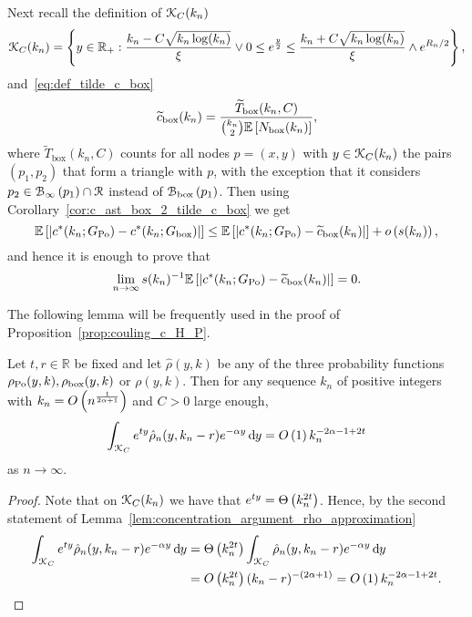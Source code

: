 Next recall the definition of ${\mathcal K}_{C}(k_n)$
\[
	{\mathcal K}_C(k_n) = \left\{y \in {\ensuremath{\mathbb R}}_+ : \frac{k_n - C \sqrt{k_n \log(k_n)}}{\xi} \vee 0 \le e^{\frac{y}{2}}
	\le \frac{k_n + C \sqrt{k_n \log(k_n)}}{\xi} \wedge e^{R_n/2} \right\},
\]
and~\eqref{eq:def_tilde_c_box}
\[
	\widetilde{c}_{\text{box}}(k_n) = \frac{\widetilde{T}_{\text{box}}(k_n,C)}{\binom{k_n}{2}\mathbb{E}\left[N_{\text{box}}(k_n)\right]},
\]
where $\widetilde{T}_{\text{box}}(k_n,C)$ counts for all nodes $p = (x,y)$ with $y \in {\mathcal K}_{C}(k_n)$ the pairs $(p_1,p_2)$ that form a triangle with $p$, with the exception that it considers $p_2 \in {\mathcal B}_{\infty}\left(p_1\right) \cap {\mathcal R}$ instead of ${\mathcal B}_{\text{box}}\left(p_1\right)$. Then using Corollary~\ref{cor:c_ast_box_2_tilde_c_box} we get
\[
	\mathbb{E}\left[\left|c^\ast(k_n; G_{\text{Po}}) - c^\ast(k_n;G_{\text{box}})\right|\right]
	\le \mathbb{E}\left[\left|c^\ast(k_n; G_{\text{Po}}) - \widetilde{c}_{\text{box}}(k_n)\right|\right] 
	+ o\left(s(k_n)\right),
\]
and hence it is enough to prove that
\[
	\lim_{n \to \infty} s(k_n)^{-1}\mathbb{E}\left[\left|c^\ast(k_n; G_{\text{Po}}) - \widetilde{c}_{\text{box}}(k_n)\right|\right] = 0.
\]



The following lemma will be frequently used in the proof of Proposition~\ref{prop:couling_c_H_P}.

\begin{lemma} \label{lem:gamma_approx}
Let $t, r \in \mathbb{R}$ be fixed and let $\hat{\rho}(y,k)$ be any of the three probability functions $\rho_{{\mathrm{Po}}}(y,k), \rho_{\text{box}}(y,k)$ or $\rho(y,k)$. Then for any sequence $k_n$ of positive integers with $k_n = O\left(n^{\frac{1}{2\alpha + 1}}\right)$ and $C > 0$ large enough,
\[
	\int_{{\mathcal K}_{C}} e^{t y} \hat{\rho}_n(y,k_n-r) e^{-\alpha y} \operatorname{\mathrm{d}\hspace{-2pt}} y = O\left(1\right) k_n^{-2\alpha - 1 + 2t}
\]
as $n \to \infty$.
\end{lemma}
\begin{proof}
Note that on ${\mathcal K}_{C}(k_n)$ we have that $e^{ty} = \Theta\left(k_n^{2t}\right)$. Hence, by the second statement of Lemma~\ref{lem:concentration_argument_rho_approximation}
\begin{align*}
	\int_{{\mathcal K}_{C}} e^{t y} \hat{\rho}_n(y,k_n-r) e^{-\alpha y} \operatorname{\mathrm{d}\hspace{-2pt}} y
	&= \Theta\left(k_n^{2t}\right) \int_{{\mathcal K}_{C}} \hat{\rho}_n(y,k_n-r) e^{-\alpha y} \operatorname{\mathrm{d}\hspace{-2pt}} y\\
	&= O\left(k_n^{2t}\right) (k_n-r)^{-(2\alpha + 1)} = O\left(1\right) k_n^{-2\alpha - 1 + 2t}.
\end{align*}
\end{proof}

